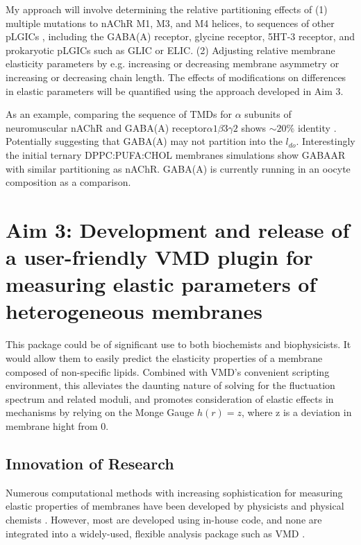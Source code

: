\documentclass{article}
\begin{document}
My approach will involve determining the relative partitioning effects of (1) multiple mutations to nAChR M1, M3, and M4 helices, to sequences of other pLGICs , including the GABA(A) receptor, glycine receptor, 5HT-3 receptor, and prokaryotic pLGICs such as GLIC or ELIC.  (2) Adjusting relative membrane elasticity parameters by e.g. increasing or decreasing membrane asymmetry or increasing or decreasing chain length. The effects of modifications on differences in elastic parameters will be quantified using the approach developed in Aim 3.

As an example, comparing the sequence of TMDs for $\alpha$ subunits of neuromuscular nAChR and GABA(A) receptor$ \alpha 1\beta 3\gamma 2 $ shows $\sim 20 \% $ identity \cite{jalv}. Potentially suggesting that GABA(A) may not partition into the $l_{do}$. Interestingly the initial ternary DPPC:PUFA:CHOL membranes simulations show GABAAR with similar partitioning as nAChR. GABA(A) is currently running in an oocyte composition as a comparison. 

\section{Aim 3: Development and release of a user-friendly VMD plugin for measuring elastic parameters of heterogeneous membranes}

This package could be of significant use to both biochemists and biophysicists. It would allow them to easily predict the elasticity properties of a membrane composed of non-specific lipids. Combined with VMD’s convenient scripting environment, this alleviates the daunting nature of solving for the fluctuation spectrum and related moduli, and promotes consideration of elastic effects in mechanisms by relying on the Monge Gauge $h(r)=z$, where z is a deviation in membrane hight from 0.  

\subsection{Innovation of Research}

Numerous computational methods with increasing sophistication for measuring elastic properties of membranes have been developed by physicists and physical chemists \cite{Galimzyanov_Undulations_2017,Brannigan2006,Pan_Effect_2009,Rawicz_Effect_2000,Goetz1999}. However, most are developed using in-house code, and none are integrated into a widely-used, flexible analysis package such as VMD \cite{HUMP96}.
\end{document}
